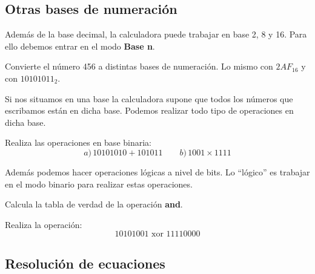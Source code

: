 \documentclass[12pt]{article}
\newenvironment{capitulo}{\begin{tcolorbox}[colback=blue!5!white,colframe=red!75!black]}{\end{tcolorbox}\bigskip}
\newenvironment{ejer}{\begin{tcolorbox}[center title, 
fonttitle=\sffamily\bfseries,colback=blue!5,colframe=orange]}{\end{tcolorbox}}
\begin{document}
\newpage

\begin{capitulo}
\section*{Otras bases de numeración}
\end{capitulo}



Además de la base decimal, la calculadora puede trabajar en base 2, 8 y 16. Para ello debemos entrar en el modo \textbf{Base n}.

\begin{ejer}

Convierte el número 456  a distintas bases de numeración. Lo mismo con $2AF_{16}$  y con 
 $10101011_2$.

\end{ejer}


Si nos situamos en una base la calculadora supone que todos los números que escribamos están en dicha base. Podemos realizar todo tipo de operaciones en dicha base.

\begin{ejer}

Realiza las operaciones en base binaria:
\[
a)\, 10101010 + 101011 \qquad b)\, 1001 \times 1111
\]

\end{ejer}




Además podemos hacer operaciones lógicas a nivel de bits. Lo ``lógico'' es trabajar en el modo binario para realizar estas operaciones.

\begin{ejer}

Calcula la tabla de verdad de la operación \textbf{and}.

\end{ejer}


\begin{ejer}

Realiza la operación:
\[
10101001 \textrm{ xor } 11110000
\]

\end{ejer}

\newpage

\begin{capitulo}
\section*{Resolución de ecuaciones}
\end{capitulo}
\end{document}
